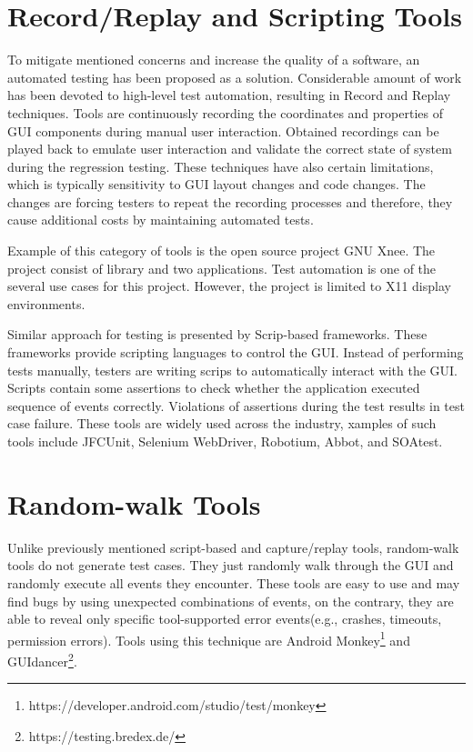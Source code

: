 \section{Record/Replay and Scripting Tools}
To mitigate mentioned concerns and increase the quality of a software, an automated testing has been proposed as a solution. Considerable amount of work has been devoted to high-level test automation, resulting in Record and Replay techniques. Tools are  continuously recording the coordinates and properties of GUI components during manual user interaction. Obtained recordings can be played back to emulate user interaction and validate the correct state of system during the regression testing. These techniques have also certain limitations, which is typically sensitivity to GUI layout changes and code changes. The changes are forcing testers to repeat the recording processes and therefore, they cause additional costs by maintaining automated tests.\cite{guitesting} 

Example of this category of tools is the open source project GNU Xnee. The project consist of library and two applications. Test automation is one of the several use cases for this project. However, the project is limited to X11 display environments.\cite{xnee}

Similar approach for testing is presented by Scrip-based frameworks. These frameworks provide scripting languages to control the GUI. Instead of performing tests manually, testers are writing scrips to automatically interact with the GUI. Scripts contain some assertions to check whether the application executed sequence of events correctly. Violations of assertions during the test results in test case failure. These tools are widely used across the industry, xamples of such tools include JFCUnit, Selenium WebDriver, Robotium, Abbot, and SOAtest.\cite{NguyenBao2014Gait}

\section{Random-walk Tools}
Unlike previously mentioned script-based and capture/replay tools, random-walk tools do not generate test cases. They just randomly walk through the GUI and randomly execute all events they encounter. These tools are easy to use and may find bugs by using unexpected combinations of events, on the contrary, they are able to reveal only specific tool-supported error events(e.g., crashes, timeouts, permission errors). Tools using this technique are Android Monkey\footnote{https://developer.android.com/studio/test/monkey} and GUIdancer\footnote{https://testing.bredex.de/}.

